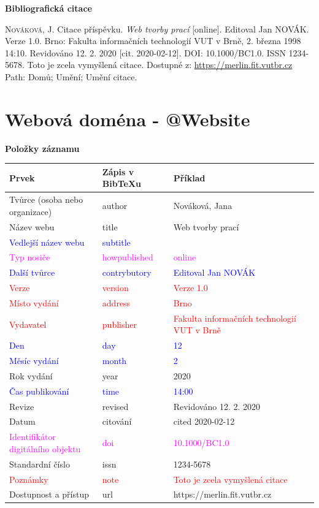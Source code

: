 \bigskip

\noindent \textbf{Bibliografická citace}

\medskip

\noindent \textsc{Nováková}, J. Citace příspěvku. \textit{Web tvorby prací} [online]. Editoval Jan NOVÁK. Verze 1.0. Brno: Fakulta informačních technologií VUT v Brně, 2. března 1998 14:10. Revidováno 12. 2. 2020 [cit. 2020-02-12]. DOI: 10.1000/BC1.0. ISSN 1234-5678. Toto je zcela vymyšlená citace. Dostupné z: \url{https://merlin.fit.vutbr.cz} Path: Domů; Umění; Umění citace.
\newpage
\section*{Webová doména - @Website}
\label{pr-website}
\noindent \textbf{Položky záznamu}

\medskip

\begin{tabularx}{\linewidth}{X X X}
    Prvek & Zápis v BibTeXu & Příklad\\\hline
    Tvůrce (osoba nebo organizace) & author & Nováková, Jana\\
    Název webu & title & Web tvorby prací\\
    \textcolor{blue}{Vedlejší název webu} &  \textcolor{blue}{subtitle} & \\
    \textcolor{magenta}{Typ nosiče} & \textcolor{magenta}{howpublished} & \textcolor{magenta}{online}\\
    \textcolor{blue}{Další tvůrce} & \textcolor{blue}{contrybutory} & \textcolor{blue}{Editoval Jan NOVÁK}\\
    \textcolor{red}{Verze} & \textcolor{red}{version} & \textcolor{red}{Verze 1.0}\\
    \textcolor{red}{Místo vydání} & \textcolor{red}{address} & \textcolor{red}{Brno}\\
    \textcolor{red}{Vydavatel} & \textcolor{red}{publisher} & \textcolor{red}{Fakulta informačních technologií VUT v Brně}\\
    \textcolor{blue}{Den} & \textcolor{blue}{day} & \textcolor{blue}{12}\\
    \textcolor{blue}{Měsíc vydání} & \textcolor{blue}{month} & \textcolor{blue}{2}\\
    Rok vydání & year & 2020\\
    \textcolor{blue}{Čas publikování} & \textcolor{blue}{time} & \textcolor{blue}{14:00}\\
    Revize & revised & Revidováno 12. 2. 2020\\
    Datum & citování & cited 2020-02-12\\
    \textcolor{magenta}{Identifikátor digitálního objektu} & \textcolor{magenta}{doi} & \textcolor{magenta}{10.1000/BC1.0}\\
    Standardní číslo & issn & 1234-5678\\
    \textcolor{red}{Poznámky} & \textcolor{red}{note} & \textcolor{red}{Toto je zcela vymyšlená citace}\\
    Dostupnost a přístup & url & https://merlin.fit.vutbr.cz
\end{tabularx}

